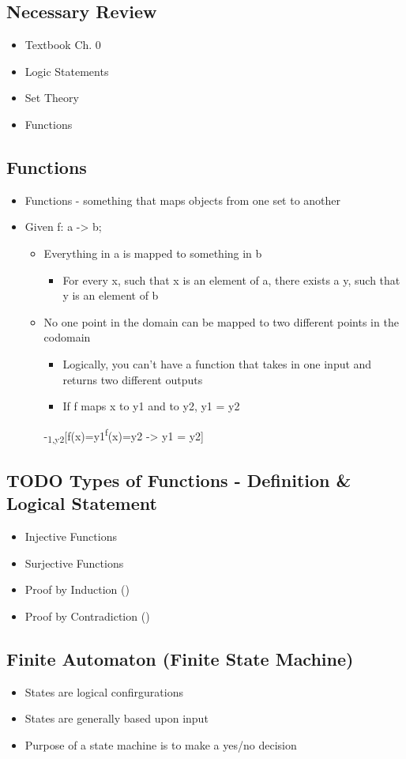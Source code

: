 \documentclass[11pt]{article}
\begin{document}
\subsection{Necessary Review}
\label{sec:org440ec9e}
\begin{itemize}
\item Textbook Ch. 0
\item Logic Statements
\item Set Theory
\item Functions
\end{itemize}
\subsection{Functions}
\label{sec:orga09a867}
\begin{itemize}
\item Functions - something that maps objects from one set to another
\item Given f: a -> b;
\begin{itemize}
\item Everything in a is mapped to something in b
\begin{itemize}
\item For every x, such that x is an element of a, there exists a y, such that y is an element of b
\end{itemize}
\item No one point in the domain can be mapped to two different points in the codomain
\begin{itemize}
\item Logically, you can't have a function that takes in one input and returns two different outputs
\item If f maps x to y1 and to y2, y1 = y2
\end{itemize}
-\Ax\inAy\textsubscript{1,y}\textsubscript{2\inB}[f(x)=y1\textsuperscript{f}(x)=y2 -> y1 = y2]
\end{itemize}
\end{itemize}
\subsection{{\bfseries\sffamily TODO} Types of Functions - Definition \& Logical Statement}
\label{sec:orgb285053}
\begin{itemize}
\item Injective Functions
\item Surjective Functions
\item Proof by Induction (\forAll)
\item Proof by Contradiction (\textlnot{}\forEach)
\end{itemize}
\subsection{Finite Automaton (Finite State Machine)}
\label{sec:org3d64faf}
\begin{itemize}
\item States are logical confirgurations
\item States are generally based upon input
\item Purpose of a state machine is to make a yes/no decision
\end{itemize}
\end{document}
